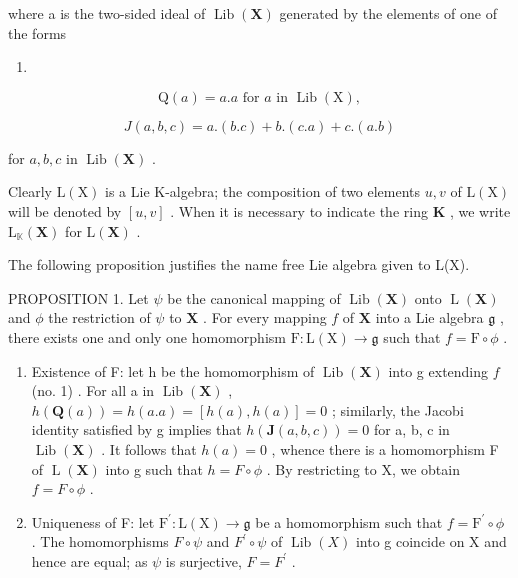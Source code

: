 where a is the two-sided ideal of \(\operatorname{Lib}(\mathbf{X})\) generated by the elements of one of the forms

\begin{enumerate}
\def\labelenumi{(\arabic{enumi})}
\tightlist
\item
\end{enumerate}

\[
\mathrm{Q} (a) = a. a \text {   for   } a \text {   in   } \operatorname{Lib} (\mathrm{X}),\tag{2}
\]

\[
J (a, b, c) = a. (b. c) + b. (c. a) + c. (a. b)
\]

for \(a, b, c\) in \(\operatorname{Lib}(\mathbf{X})\) .

Clearly \(\mathrm{L}(\mathrm{X})\) is a Lie K-algebra; the composition of two elements \(u, v\) of \(\mathrm{L}(\mathrm{X})\) will be denoted by \([u, v]\) . When it is necessary to indicate the ring \(\mathbf{K}\) , we write \(\mathrm{L}_{\mathbb{K}}(\mathbf{X})\) for \(\mathrm{L}(\mathbf{X})\) .

The following proposition justifies the name free Lie algebra given to L(X).

PROPOSITION 1. Let \(\psi\) be the canonical mapping of \(\operatorname{Lib}(\mathbf{X})\) onto \(\operatorname{L}(\mathbf{X})\) and \(\phi\) the restriction of \(\psi\) to \(\mathbf{X}\) . For every mapping \(f\) of \(\mathbf{X}\) into a Lie algebra \(\mathfrak{g}\) , there exists one and only one homomorphism \(\mathrm{F}:\mathrm{L}(\mathrm{X})\to \mathfrak{g}\) such that \(f = \mathrm{F}\circ \phi\) .

\begin{enumerate}
\def\labelenumi{(\alph{enumi})}
\item
  Existence of F: let h be the homomorphism of \(\operatorname{Lib}(\mathbf{X})\) into g extending \(f\) (no. 1) . For all a in \(\operatorname{Lib}(\mathbf{X})\) , \(h(\mathbf{Q}(a)) = h(a.a) = [h(a), h(a)] = 0\) ; similarly, the Jacobi identity satisfied by g implies that \(h(\mathbf{J}(a, b, c)) = 0\) for a, b, c in \(\operatorname{Lib}(\mathbf{X})\) . It follows that \(h(a) = 0\) , whence there is a homomorphism F of \(\operatorname{L}(\mathbf{X})\) into g such that \(h = F \circ \phi\) . By restricting to X, we obtain \(f = F \circ \phi\) .
\item
  Uniqueness of F: let \(\mathrm{F}^{\prime}:\mathrm{L}(\mathrm{X})\to\mathfrak{g}\) be a homomorphism such that \(f=\mathrm{F}^{\prime}\circ\phi\) . The homomorphisms \(F\circ\psi\) and \(F^{\prime}\circ\psi\) of \(\operatorname{Lib}(X)\) into g coincide on X and hence are equal; as \(\psi\) is surjective, \(F=F^{\prime}\) .
\end{enumerate}

